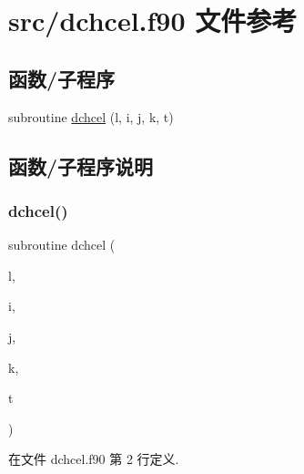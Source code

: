 \hypertarget{dchcel_8f90}{}\section{src/dchcel.f90 文件参考}
\label{dchcel_8f90}
\subsection*{函数/子程序}
\begin{DoxyCompactItemize}
\item 
subroutine \mbox{\hyperlink{dchcel_8f90_a8b4c3c2a6b5f6732c2092fd53718f88f}{dchcel}} (l, i, j, k, t)
\end{DoxyCompactItemize}


\subsection{函数/子程序说明}
\mbox{\label{dchcel_8f90_a8b4c3c2a6b5f6732c2092fd53718f88f}} 
\subsubsection{\texorpdfstring{dchcel()}{dchcel()}}
{\footnotesize\ttfamily subroutine dchcel (\begin{DoxyParamCaption}\item[{}]{l,  }\item[{}]{i,  }\item[{}]{j,  }\item[{}]{k,  }\item[{}]{t }\end{DoxyParamCaption})}



在文件 dchcel.\+f90 第 2 行定义.

